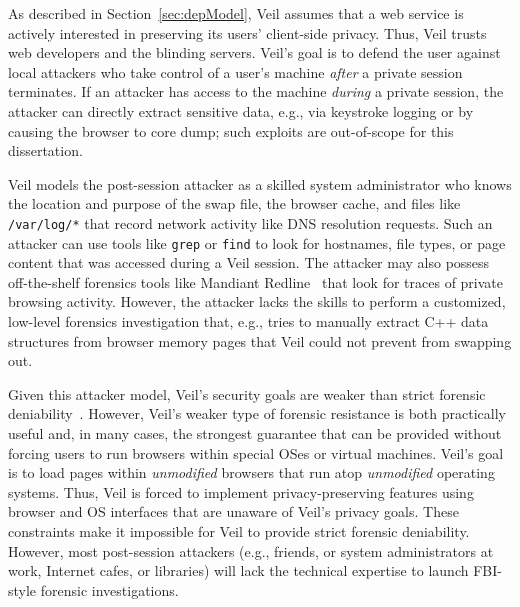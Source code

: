 As described in Section~\ref{sec:depModel}, Veil
assumes that a web service is actively interested
in preserving its users' client-side privacy.
Thus, Veil trusts web developers and the blinding servers.
Veil's goal is to defend the user against local
attackers who take control of a user's machine
\textit{after} a private session terminates. If an
attacker has access to the machine \emph{during} a
private session, the attacker can directly extract
sensitive data, e.g., via keystroke logging or by
causing the browser to core dump; such exploits are
out-of-scope for this dissertation.

Veil models the post-session attacker as a skilled
system administrator who knows the location and purpose
of the swap file, the browser cache, and files like
\texttt{/var/log/*} that record network activity
like DNS resolution requests. Such an attacker can
use tools like \texttt{grep} or \texttt{find} to
look for hostnames, file types, or page content that
was accessed during a Veil session. The attacker
may also possess off-the-shelf forensics tools like
Mandiant Redline~\cite{mandiant} that look for traces
of private browsing activity. However, the attacker
lacks the skills to perform a customized, low-level
forensics investigation that, e.g., tries to manually
extract C++ data structures from browser memory
pages that Veil could not prevent from swapping out.

Given this attacker model, Veil's security goals are
weaker than strict forensic deniability~\cite{lacuna}.
However, Veil's weaker type of forensic resistance
is both practically useful and, in many cases, the
strongest guarantee that can be provided without
forcing users to run browsers within special OSes or
virtual machines. Veil's goal is to load pages within
\textit{unmodified} browsers that run atop
\textit{unmodified} operating systems. Thus, Veil
is forced to implement privacy-preserving features
using browser and OS interfaces that are unaware of
Veil's privacy goals. These constraints make it
impossible for Veil to provide strict forensic
deniability. However, most post-session attackers
(e.g., friends, or system administrators at work,
Internet cafes, or libraries) will
lack the technical expertise to launch FBI-style
forensic investigations.


